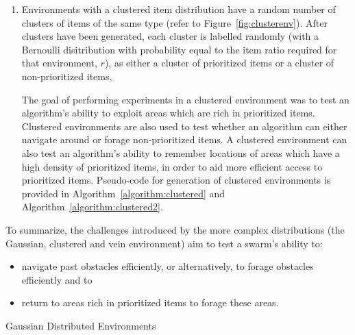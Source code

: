 \begin{enumerate}
\item Environments with a clustered item distribution have a random number of clusters of items of the same type (refer to Figure~\ref{fig:clusterenv}). After clusters have been generated, each cluster is labelled randomly (with a Bernoulli disitribution with probability equal to the item ratio required for that environment, $r$), as either a cluster of prioritized items or a cluster of non-prioritized items, 

The goal of performing experiments in a clustered environment was to test an algorithm's ability to exploit areas which are rich in prioritized items. Clustered environments are also used to test whether an algorithm can either navigate around or forage non-prioritized items. A clustered environment can also test an algorithm's ability to remember locations of areas which have a high density of prioritized items, in order to aid more efficient access to prioritized items.  Pseudo-code for generation of clustered environments is provided in Algorithm~\ref{algorithm:clustered} and Algorithm~\ref{algorithm:clustered2}.


\end{enumerate} 

To summarize, the challenges introduced by the more complex distributions (the Gaussian, clustered and vein environment) aim to test a swarm's ability to:

\begin{itemize}
\item navigate past obstacles efficiently, or alternatively, to forage obstacles efficiently and to
\item return to areas rich in prioritized items to forage these areas.
\end{itemize}



\begin{algorithm}
\caption{Gaussian Distributed Environments}
\label{algorithm:gaussian}
\begin{algorithmic}[1]
	\State {}
	\State {}
	\State {}
	\State {}
		\State {}
		\State {}
			\State {}
			\State {}
		\EndIf
	\EndWhile

		\State {}
		\State {}
			\State {}
			\State {}
		\EndIf
	\EndWhile
\EndFunction
\end{algorithmic}
\end{algorithm}


